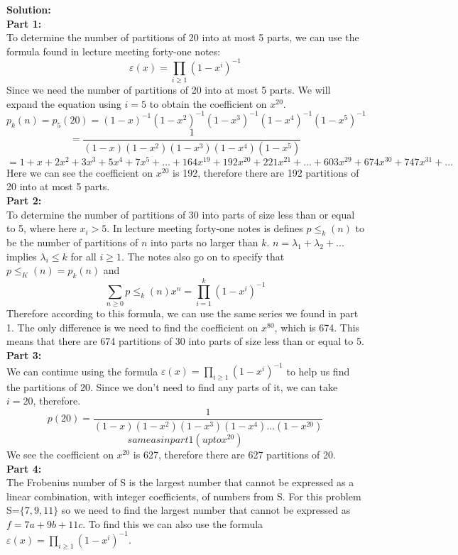 \documentclass[10pt,a4paper]{report}
\begin{document}
	\textbf{Solution: }\\
	\newline
	\textbf{Part 1:}\\
	To determine the number of partitions of 20 into at most 5 parts, we can use the formula found in lecture meeting forty-one notes:\\
	\[\varepsilon(x) = \prod_{i\geq1}^{}(1-x^i)^{-1}\]
	Since we need the number of partitions of 20 into at most 5 parts.  We will expand the equation using $i=5$ to obtain the coefficient on $x^20$.\\
	\[p_k(n) = p_5(20) = (1-x)^{-1}(1-x^2)^{-1}(1-x^3)^{-1}(1-x^4)^{-1}(1-x^5)^{-1}\]
	\[ = \frac{1}{(1-x)(1-x^2)(1-x^3)(1-x^4)(1-x^5)}\]
	\[ = 1 + x + 2x^2 + 3x^3 + 5x^4 + 7x^5 + ... + 164x^{19} + 192x^{20} + 221x^{21} + ... + 603x^{29} + 674x^{30} + 747x^{31} + ...\]
	Here we can see the coefficient on $x^{20}$ is 192, therefore there are 192 partitions of 20 into at most 5 parts.\\
	\newline
	\textbf{Part 2:}\\
	To determine the number of partitions of 30 into parts of size less than or equal to 5, where here $x_i>5$.  In lecture meeting forty-one notes is defines $p\leq_k(n)$ to be the number of partitions of $n$ into parts no larger than $k$.  $n=\lambda_1 + \lambda_2 + ...$ implies $\lambda_i\leq k$ for all $i\geq1$.  The notes also go on to specify that $p\leq_K(n) = p_k(n)$ and
	\[\sum_{n\geq0}^{}p\leq_k(n)x^n = \prod_{i=1}^{k}(1-x^i)^{-1}\]
	Therefore according to this formula, we can use the same series we found in part 1.  The only difference is we need to find the coefficient on $x^{80}$, which is 674.  This means that there are 674 partitions of 30 into parts of size less than or equal to 5.\\
	\newline
	\textbf{Part 3:}\\
	We can continue using the formula $\varepsilon(x) = \prod_{i\geq1}^{}(1-x^i)^{-1}$ to help us find the partitions of 20. Since we don't need to find any parts of it, we can take $i=20$, therefore.
	\[p(20) = \frac{1}{(1-x)(1-x^2)(1-x^3)(1-x^4)...(1-x^{20})}\]
	\[same as in part 1 (up to x^{20})\]
	We see the coefficient on $x^{20}$ is 627, therefore there are 627 partitions of 20.\\
	\newline
	\textbf{Part 4:}\\
	The Frobenius number of S is the largest number that cannot be expressed as a linear combination, with integer coefficients, of numbers from S.  For this problem S=$\{7,9,11\}$ so we need to find the largest number that cannot be expressed as $f=7a + 9b + 11c$.  To find this we can also use the formula $\varepsilon(x) = \prod_{i\geq1}^{}(1-x^i)^{-1}$.\\
\end{document}
